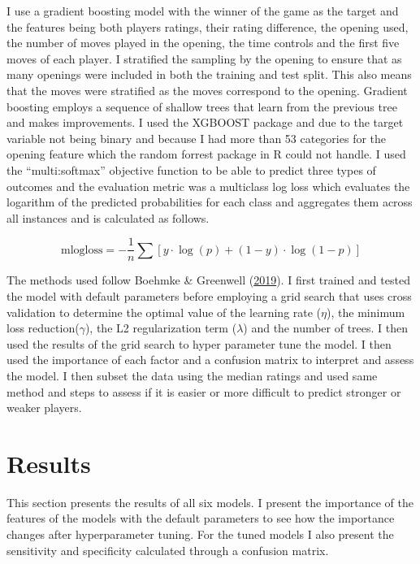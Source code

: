 \documentclass[12pt,preprint, authoryear]{elsarticle}
\numberwithin{equation}{section}
\numberwithin{figure}{section}
\numberwithin{table}{section}
\begin{document}
I use a gradient boosting model with the winner of the game as the
target and the features being both players ratings, their rating
difference, the opening used, the number of moves played in the opening,
the time controls and the first five moves of each player. I stratified
the sampling by the opening to ensure that as many openings were
included in both the training and test split. This also means that the
moves were stratified as the moves correspond to the opening. Gradient
boosting employs a sequence of shallow trees that learn from the
previous tree and makes improvements. I used the XGBOOST package and due
to the target variable not being binary and because I had more than 53
categories for the opening feature which the random forrest package in R
could not handle. I used the ``multi:softmax'' objective function to be
able to predict three types of outcomes and the evaluation metric was a
multiclass log loss which evaluates the logarithm of the predicted
probabilities for each class and aggregates them across all instances
and is calculated as follows.

\begin{equation}
\text{{mlogloss}} = -\frac{1}{n} \sum \left[ y \cdot \log(p) + (1-y) \cdot \log(1-p) \right]
\end{equation}

The methods used follow Boehmke \& Greenwell
(\protect\hyperlink{ref-homl2019}{2019}). I first trained and tested the
model with default parameters before employing a grid search that uses
cross validation to determine the optimal value of the learning rate
(\(\eta\)), the minimum loss reduction(\(\gamma\)), the L2
regularization term (\(\lambda\)) and the number of trees. I then used
the results of the grid search to hyper parameter tune the model. I then
used the importance of each factor and a confusion matrix to interpret
and assess the model. I then subset the data using the median ratings
and used same method and steps to assess if it is easier or more
difficult to predict stronger or weaker players.

\hypertarget{results}{%
\section{Results}\label{results}}

This section presents the results of all six models. I present the
importance of the features of the models with the default parameters to
see how the importance changes after hyperparameter tuning. For the
tuned models I also present the sensitivity and specificity calculated
through a confusion matrix.
\end{document}

